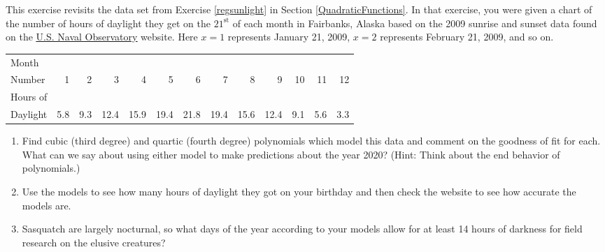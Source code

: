 \documentclass{ximera}
\begin{document}
\begin{problem}\label{sunlighthigherorder} 
This exercise revisits the data set from Exercise \ref{regsunlight} in Section \ref{QuadraticFunctions}.  In that exercise, you were given a chart of the number of hours of daylight they get on the $21^{\mbox{st}}$ of each month in Fairbanks, Alaska based on the 2009 sunrise and sunset data found on the  \href{http://aa.usno.navy.mil/data/docs/RS_OneYear.php}{\underline{U.S. Naval Observatory}} website.  Here  $x = 1$ represents January 21, 2009, $x = 2$ represents February 21, 2009, and so on.  


\small

\noindent \begin{tabular}{|l|r|r|r|r|r|r|r|r|r|r|r|r|} \hline
Month  & & & & & & & & & & & & \\
Number & 1 & 2 & 3 & 4 & 5 & 6 & 7 & 8 & 9 & 10 & 11 & 12\\ 
\hline 
Hours of  & & & & & & & & & & & & \\
Daylight & 5.8 & 9.3 & 12.4 & 15.9 & 19.4 & 21.8 & 19.4 & 15.6 & 12.4 & 9.1 & 5.6 & 3.3 \\ \hline
\end{tabular}

\begin{enumerate}

\item Find cubic (third degree) and quartic (fourth degree) polynomials which model this data and comment on the goodness of fit for each.  What can we say about using either model to make predictions about the year 2020?  (Hint: Think about the end behavior of polynomials.)  

\item Use the models to see how many hours of daylight they got on your birthday and then check the website to see how accurate the models are.  

\item Sasquatch are largely nocturnal, so what days of the year according to your models  allow for at least 14 hours of darkness for field research on the elusive creatures? 

\end{enumerate}
\end{problem}
\end{document}
